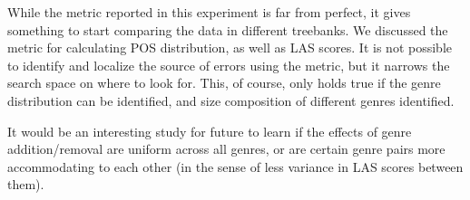 While the metric reported in this experiment is far from perfect, it gives something to start comparing the data in different treebanks. We discussed the metric for calculating POS distribution, as well as LAS scores. It is not possible to identify and localize the source of errors using the metric, but it narrows the search space on where to look for. This, of course, only holds true if the genre distribution can be identified, and size composition of different genres identified.

It would be an interesting study for future to learn if the effects of genre addition/removal are uniform across all genres, or are certain genre pairs more accommodating to each other (in the sense of less variance in LAS scores between them).

